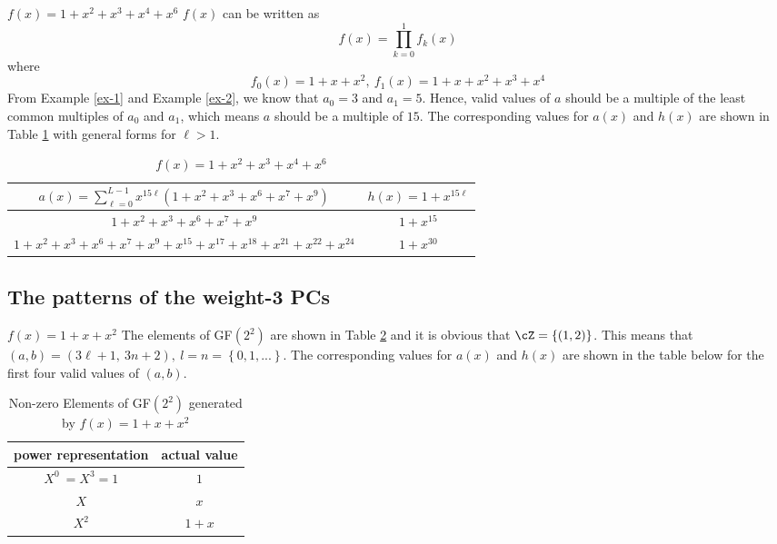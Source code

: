 \begin{example}
	$f(x)=1+x^2+x^3+x^4+x^6$\newline
	$f(x)$ can be written as 
	$$f(x)=\prod_{k=0}^{1}f_k(x)$$
	where 
	$$f_0(x)=1+x+x^2,~f_1(x)=1+x+x^2+x^3+x^4$$ 
	From Example \ref{ex-1} and Example \ref{ex-2}, we know that $a_0=3$ and $a_1=5$.
	Hence, valid values of $a$ should be a multiple of the least common multiples of $a_0$ and $a_1$, which means $a$ should be a multiple of $15$.
	The corresponding values for $a(x)$ and $h(x)$ are shown in Table \ref{novelTab1-c} with general forms for $\ell>1$.
	\begin{table}[htbp]
		\renewcommand{\arraystretch}{1.3}
		\caption{$f(x)=1+x^2+x^3+x^4+x^6$}
		\centering
		\begin{tabular}{c c } 
			\hline
			$a(x)=\sum_{\ell=0}^{L-1} x^{15\ell}(1+x^2+x^3+x^6+x^7+x^9)$ & $h(x)=1+x^{15\ell}$ \\ [0.5ex] 
			\hline\hline
			$1+x^2+x^3+x^6+x^7+x^9$ & $1+x^{15}$\\ 
			$1+x^2+x^3+x^6+x^7+x^9+x^{15}+x^{17}+x^{18}+x^{21}+x^{22}+x^{24}$ & $1+x^{30}$ \\
		\end{tabular}
		\label{novelTab1-c}
	\end{table}
	
\end{example}



\subsection{The patterns of the weight-3 PCs}
\begin{example}
	$f(x)=1+x+x^2$ \newline
	The elements of GF$(2^2)$ are shown in Table \ref{novelTab7} and it is obvious that $\cZ=\{(1,2)\}$.
	This means that $(a,b) = (3\ell+1,~3n+2),~l=n=\left\{0,1,...\right\}$.  The corresponding values for $a(x)$ and $h(x)$ are shown in the table below for the first four valid values of $(a,b)$.
	\label{ex-5}
\end{example}

\begin{table}[htbp]
	\caption{Non-zero Elements of GF$(2^2)$ generated by $f(x)=1+x+x^2$}
	\centering
	\begin{tabular}{c c} 
		\hline
		power representation & actual value \\ [0.5ex] 
		\hline\hline
		$X^0~=X^3=1$ & $1$\\
		\hline
		$X$ & $x$\\
		\hline
		$X^2$ &  $1+x$\\
		\hline
	\end{tabular}
	\label{novelTab7}
\end{table}

